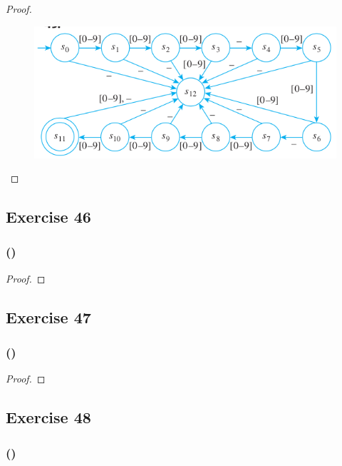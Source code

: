 \documentclass[14pt]{extarticle}
\begin{document}
\begin{proof}
\begin{figure}[ht!]
\centering
\includegraphics[scale=0.5]{../images/12.2.45.png}
\end{figure}
\end{proof}

\subsection{Exercise 46}

\subsubsection{()}

\begin{proof}

\end{proof}

\subsection{Exercise 47}

\subsubsection{()}

\begin{proof}

\end{proof}

\subsection{Exercise 48}

\subsubsection{()}
\end{document}
